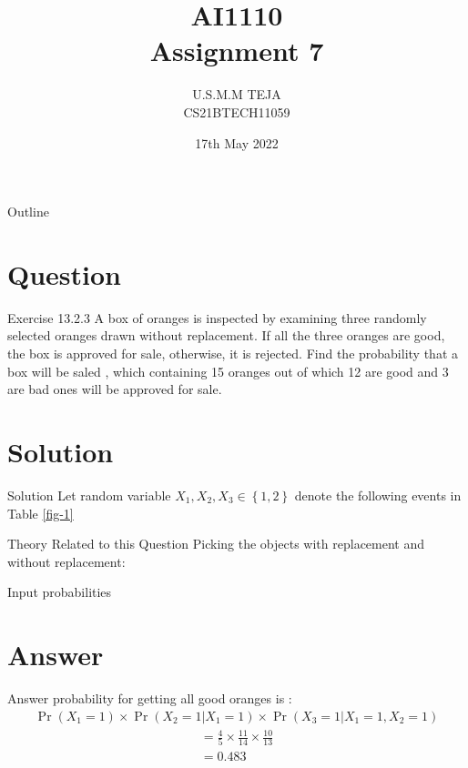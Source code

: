 \documentclass{beamer}
\title{AI1110 \\ Assignment 7}
\author{U.S.M.M TEJA \\ CS21BTECH11059}
\date{17th May 2022}
\providecommand{\pr}[1]{\ensuremath{\Pr\left(#1\right)}}
\providecommand{\cbrak}[1]{\ensuremath{\left\{#1\right\}}}
\begin{document}
	\begin{frame}
		\titlepage
	\end{frame}
	
	\begin{frame}{Outline}
    		\tableofcontents
	\end{frame}
	
	\section{Question}
	\begin{frame}{Exercise 13.2.3}
	A box of oranges is inspected by examining three randomly selected oranges drawn without replacement. If all the three oranges are good, the box is approved for sale, otherwise, it is rejected. Find the probability that a box will be saled , which containing 15 oranges out of which 12 are good and 3 are bad ones will be approved for sale.
	\end{frame}
	
	\section{Solution}
	\begin{frame}{Solution}
	Let random variable $X_1, X_2, X_3 \in \cbrak{1,2}$ denote the following events in Table \eqref{fig-1}
	\begin{table}[ht!]
		\centering
		
		\caption{Description of events}
		\label{table:table1}	
	\end{table}

		\end{frame}


	\begin{frame}{Theory Related to this Question}
Picking the objects with replacement and without replacement:
	\end{frame}
	
		\begin{frame}{Input probabilities}
	\begin{table}[ht!]
		\centering
		
		\caption{Input probabilities}
		\label{table:table2}	
	\end{table}
	\end{frame}

	\section{Answer}
	\begin{frame}{Answer}
probability for getting all good oranges is :
\begin{multline}
\pr{X_1=1} \times \pr{X_2 = 1|X_1 = 1} \times
\pr{X_3 = 1|X_1 = 1, X_2=1}
\end{multline}
\begin{align}
    & = \frac{4}{5} \times \frac{11}{14} \times \frac{10}{13} & \\
    & = 0.483 &
\end{align}
	\end{frame}
	
\end{document}
